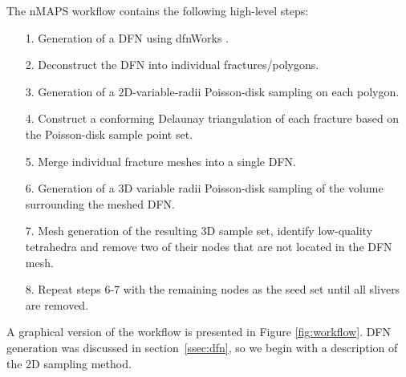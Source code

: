 \documentclass[preprint, 10pt]{elsarticle}
\theoremstyle{definition}
\theoremstyle{remark}
\begin{document}
The nMAPS workflow contains the following high-level steps:
\begin{enumerate}
\item[1.] Generation of a DFN using dfnWorks \cite{dfn}. 
\item[2.] Deconstruct the DFN into individual fractures/polygons.
\item[3.] Generation of a 2D-variable-radii Poisson-disk sampling on each polygon.
\item[4.] Construct a conforming Delaunay triangulation of each fracture based on the Poisson-disk sample point set.
\item[5.] Merge individual fracture meshes into a single DFN. 
\item[6.] Generation of a 3D variable radii Poisson-disk sampling of the volume surrounding the meshed DFN.
\item[7.] Mesh generation of the resulting 3D sample set, identify low-quality tetrahedra and remove two of their nodes that are not located in the DFN mesh.
\item[8.] Repeat steps 6-7 with the remaining nodes as the seed set until all slivers are removed. 
\end{enumerate}
A graphical version of the workflow is presented in Figure \ref{fig:workflow}.
DFN generation was discussed in section~\ref{ssec:dfn}, so we begin with a description of the 2D sampling method.
\end{document}
